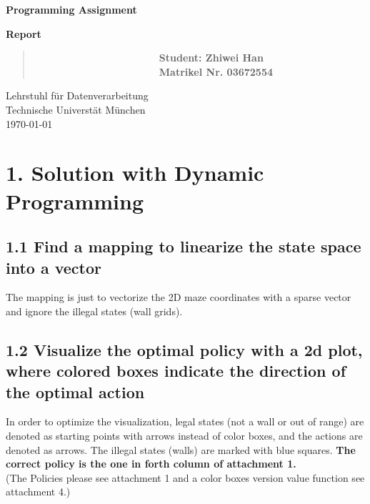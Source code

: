 \documentclass[12pt,a4paper,titlepage]{article}
\begin{document}
\begin{titlepage}
    \begin{center}
        \vspace*{3.5cm}
        
        \textbf{\huge{Programming Assignment}}
        \vspace{1cm}

        \textbf{\huge{Report}}

        \vspace{6cm}

        \begin{verse}
            \ \ \ \ \ \ \ \ \ \ \ \ \ \ \ \ \ \ \ \ \ \ \ \ \ \textbf{\large{Student: Zhiwei Han}}\\
            \ \ \ \ \ \ \ \ \ \ \ \ \ \ \ \ \ \ \ \ \ \ \ \ \ \textbf{\large{Matrikel Nr. 03672554
            }}\\
        \end{verse}


        
        \vspace{1cm}
        
        
        Lehrstuhl f\"ur Datenverarbeitung\\
        Technische Universt\"at M\"unchen\\
        \today
        
    \end{center}
\end{titlepage}



\setlength{\parindent}{0pt} \setlength{\parskip}{2ex plus 0.5ex
minus 0.2ex}


\section*{1. Solution with Dynamic Programming}
\subsection*{1.1 Find a mapping to linearize the state space into a vector}
The mapping is just to vectorize the 2D maze coordinates with a sparse vector and ignore the illegal states (wall grids).
\subsection*{1.2 Visualize the optimal policy with a 2d plot, where colored boxes indicate the direction of the optimal action}
In order to optimize the visualization, legal states (not a wall or out of range) are denoted as starting points with arrows instead of color boxes, and the actions are denoted as arrows. The illegal states (walls) are marked with blue squares. \textbf{The correct policy is the one in forth column of attachment 1.}\\
(The Policies please see attachment 1 and a color boxes version value function see attachment 4.)
\end{document}
